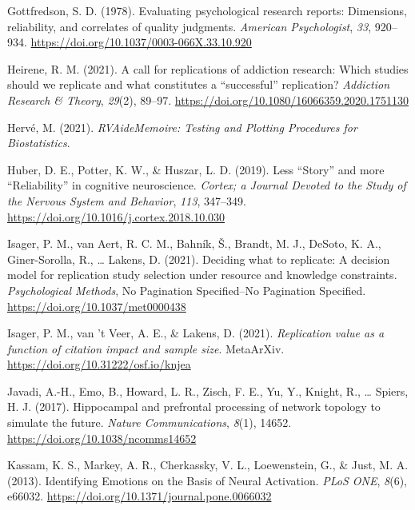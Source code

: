 \documentclass[
  man,floatsintext]{apa6}
\newlength{\cslhangindent}
\newlength{\cslentryspacingunit} %
\newenvironment{CSLReferences}[2] %
 {%
  \setlength{\parindent}{0pt}
  \ifodd #1
  \let\oldpar\par
  \def\par{\hangindent=\cslhangindent\oldpar}
  \fi
  \setlength{\parskip}{#2\cslentryspacingunit}
 }%
 {}
\begin{document}
\begin{CSLReferences}{1}{0}
\leavevmode{}%
Gottfredson, S. D. (1978). Evaluating psychological research reports: {Dimensions}, reliability, and correlates of quality judgments. \emph{American Psychologist}, \emph{33}, 920--934. \url{https://doi.org/10.1037/0003-066X.33.10.920}

\leavevmode{}%
Heirene, R. M. (2021). A call for replications of addiction research: Which studies should we replicate and what constitutes a {``successful''} replication? \emph{Addiction Research \& Theory}, \emph{29}(2), 89--97. \url{https://doi.org/10.1080/16066359.2020.1751130}

\leavevmode{}%
Hervé, M. (2021). \emph{{RVAideMemoire}: {Testing} and {Plotting Procedures} for {Biostatistics}}.

\leavevmode{}%
Huber, D. E., Potter, K. W., \& Huszar, L. D. (2019). Less {``{Story}''} and more {``{Reliability}''} in cognitive neuroscience. \emph{Cortex; a Journal Devoted to the Study of the Nervous System and Behavior}, \emph{113}, 347--349. \url{https://doi.org/10.1016/j.cortex.2018.10.030}

\leavevmode{}%
Isager, P. M., van Aert, R. C. M., Bahník, Š., Brandt, M. J., DeSoto, K. A., Giner-Sorolla, R., \ldots{} Lakens, D. (2021). Deciding what to replicate: {A} decision model for replication study selection under resource and knowledge constraints. \emph{Psychological Methods}, No Pagination Specified--No Pagination Specified. \url{https://doi.org/10.1037/met0000438}

\leavevmode{}%
Isager, P. M., van 't Veer, A. E., \& Lakens, D. (2021). \emph{Replication value as a function of citation impact and sample size}. {MetaArXiv}. \url{https://doi.org/10.31222/osf.io/knjea}

\leavevmode{}%
Javadi, A.-H., Emo, B., Howard, L. R., Zisch, F. E., Yu, Y., Knight, R., \ldots{} Spiers, H. J. (2017). Hippocampal and prefrontal processing of network topology to simulate the future. \emph{Nature Communications}, \emph{8}(1), 14652. \url{https://doi.org/10.1038/ncomms14652}

\leavevmode{}%
Kassam, K. S., Markey, A. R., Cherkassky, V. L., Loewenstein, G., \& Just, M. A. (2013). Identifying {Emotions} on the {Basis} of {Neural Activation}. \emph{PLoS ONE}, \emph{8}(6), e66032. \url{https://doi.org/10.1371/journal.pone.0066032}


\end{CSLReferences}
\end{document}
